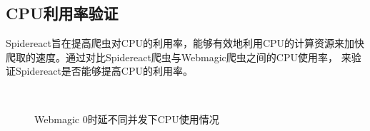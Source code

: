 \documentclass[master]{njuthesis}
\begin{document}
\subsection{CPU利用率验证}
Spidereact旨在提高爬虫对CPU的利用率，能够有效地利用CPU的计算资源来加快爬取的速度。通过对比Spidereact爬虫与Webmagic爬虫之间的CPU使用率，
来验证Spidereact是否能够提高CPU的利用率。


\begin{figure}[!htbp]
\centering
{}
  \hfill
  \\
  \hfill
\caption{Webmagic 0时延不同并发下CPU使用情况}\label{fig:concurrent}
\end{figure}
\end{document}
